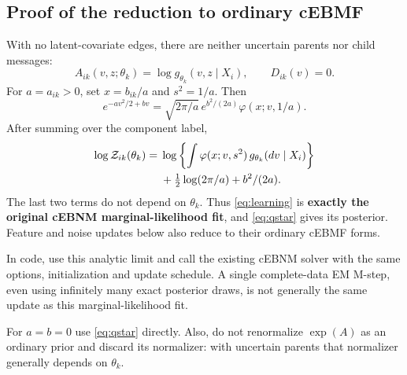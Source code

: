 \documentclass[11pt,a4paper]{article}
\newcommand{\Normal}[3]{\varphi(#1;#2,#3)}
\begin{document}
\subsection{Proof of the reduction to ordinary cEBMF}
With no latent-covariate edges, there are neither uncertain parents nor
child messages:
\[
A_{ik}(v,z;\theta_k)=\log g_{\theta_k}(v,z\mid X_i),\qquad D_{ik}(v)=0.
\]
For \(a=a_{ik}>0\), set \(x=b_{ik}/a\) and \(s^2=1/a\). Then
\[
e^{-av^2/2+bv}=\sqrt{2\pi/a}\,e^{b^2/(2a)}\Normal{x}{v}{1/a}.
\]
After summing over the component label,
\begin{align}
\log\mathcal Z_{ik}(\theta_k)
={}&\log\left\{\int\Normal{x}{v}{s^2}\,
g_{\theta_k}(dv\mid X_i)\right\}\notag\\
 &+\tfrac12\log(2\pi/a)+b^2/(2a).
\label{eq:reduction}
\end{align}
The last two terms do not depend on \(\theta_k\). Thus \eqref{eq:learning} is
\textbf{exactly the original cEBNM marginal-likelihood fit}, and
\eqref{eq:qstar} gives its posterior. Feature and noise updates below also
reduce to their ordinary cEBMF forms.

In code, use this analytic limit and call the existing cEBNM solver with
the same options, initialization and update schedule. A single
complete-data EM M-step, even using infinitely many exact posterior draws,
is not generally the same update as this marginal-likelihood fit.

For \(a=b=0\) use \eqref{eq:qstar} directly. Also, do not renormalize \(\exp(A)\)
as an ordinary prior and discard its normalizer: with uncertain parents
that normalizer generally depends on \(\theta_k\).

\clearpage
\end{document}

